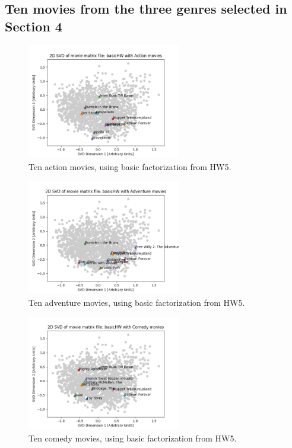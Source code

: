 \subsection{Ten movies from the three genres selected in Section 4}
    \begin{figure}[H]
    \centering
    \includegraphics[width=0.6\textwidth]{../Figures/fig4a.png}
    \caption{Ten action movies, using basic factorization from HW5.}
    \end{figure}
    \begin{figure}[H]
    \centering
    \includegraphics[width=0.6\textwidth]{../Figures/fig4b.png}
    \caption{Ten adventure movies, using basic factorization from HW5.}
    \end{figure}
    \begin{figure}[H]
    \centering
    \includegraphics[width=0.6\textwidth]{../Figures/fig4c.png}
    \caption{Ten comedy movies, using basic factorization from HW5.}
    \end{figure}
    
